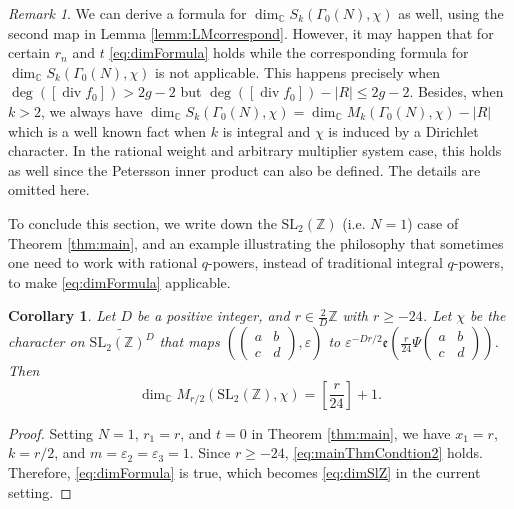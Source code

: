 \documentclass[12pt]{amsart}
\numberwithin{equation}{section}
\theoremstyle{plain}
\newtheorem{coro}[thm]{Corollary}
\theoremstyle{definition}
\theoremstyle{remark}
\newtheorem{rema}[thm]{Remark}
\newcommand\tbtmat[4]{\left(\begin{smallmatrix}{#1} & {#2} \\ {#3} & {#4}\end{smallmatrix}\right)}
\newcommand*\abs[1]{\lvert#1\rvert}
\newcommand\etp[1]{\mathfrak{e}\left(#1\right)}
\renewcommand\div{\mathop{\mathrm{div}}}
\newcommand\numZ{\mathbb{Z}}
\newcommand\numC{\mathbb{C}}
\newcommand\slZ{\mathrm{SL}_2(\mathbb{Z})}
\newcommand\elesltRaDs[5]{\left(\left(\begin{smallmatrix}{#1} & {#2} \\ {#3} & {#4}\end{smallmatrix}\right),{#5}\right)}
\newcommand\Dcover[2]{\widetilde{#1^{#2}}}
\begin{document}
\begin{rema}
We can derive a formula for $\dim_\numC S_k(\Gamma_0(N), \chi)$ as well, using the second map in Lemma \ref{lemm:LMcorrespond}. However, it may happen that for certain $r_n$ and $t$ \eqref{eq:dimFormula} holds while the corresponding formula for $\dim_\numC S_k(\Gamma_0(N), \chi)$ is not applicable. This happens precisely when $\deg\left([\div f_0]\right)>2g-2$ but $\deg\left([\div f_0]\right)-\abs{R}\leq2g-2$. Besides, when $k>2$, we always have $\dim_\numC S_k(\Gamma_0(N), \chi)=\dim_\numC M_k(\Gamma_0(N), \chi)-\abs{R}$ which is a well known fact when $k$ is integral and $\chi$ is induced by a Dirichlet character. In the rational weight and arbitrary multiplier system case, this holds as well since the Petersson inner product can also be defined. The details are omitted here.
\end{rema}

To conclude this section, we write down the $\slZ$ (i.e. $N=1$) case of Theorem \ref{thm:main}, and an example illustrating the philosophy that sometimes one need to work with rational $q$-powers, instead of traditional integral $q$-powers, to make \eqref{eq:dimFormula} applicable.

\begin{coro}
Let $D$ be a positive integer, and $r\in\frac{2}{D}\numZ$ with $r\geq-24$. Let $\chi$ be the character on $\Dcover{\slZ}{D}$ that maps $\elesltRaDs{a}{b}{c}{d}{\varepsilon}$ to $\varepsilon^{-Dr/2}\etp{\frac{r}{24}\Psi\tbtmat{a}{b}{c}{d}}$. Then
\begin{equation}
\label{eq:dimSlZ}
\dim_\numC M_{r/2}(\slZ, \chi)=\left[\frac{r}{24}\right]+1.
\end{equation}
\end{coro}
\begin{proof}
Setting $N=1$, $r_1=r$, and $t=0$ in Theorem \ref{thm:main}, we have $x_1=r$, $k=r/2$, and $m=\varepsilon_2=\varepsilon_3=1$. Since $r\geq-24$, \eqref{eq:mainThmCondtion2} holds. Therefore, \eqref{eq:dimFormula} is true, which becomes \eqref{eq:dimSlZ} in the current setting.
\end{proof}
\end{document}
